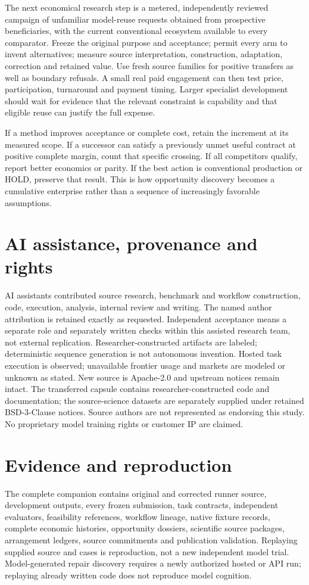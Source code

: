 \documentclass[11pt,letterpaper]{article}
\begin{document}
The next economical research step is a metered, independently reviewed campaign of unfamiliar model-reuse requests obtained from prospective beneficiaries, with the current conventional ecosystem available to every comparator. Freeze the original purpose and acceptance; permit every arm to invent alternatives; measure source interpretation, construction, adaptation, correction and retained value. Use fresh source families for positive transfers as well as boundary refusals. A small real paid engagement can then test price, participation, turnaround and payment timing. Larger specialist development should wait for evidence that the relevant constraint is capability and that eligible reuse can justify the full expense.

If a method improves acceptance or complete cost, retain the increment at its measured scope. If a successor can satisfy a previously unmet useful contract at positive complete margin, count that specific crossing. If all competitors qualify, report better economics or parity. If the best action is conventional production or HOLD, preserve that result. This is how opportunity discovery becomes a cumulative enterprise rather than a sequence of increasingly favorable assumptions.

\section*{AI assistance, provenance and rights}
AI assistants contributed source research, benchmark and workflow construction, code, execution, analysis, internal review and writing. The named author attribution is retained exactly as requested. Independent acceptance means a separate role and separately written checks within this assisted research team, not external replication. Researcher-constructed artifacts are labeled; deterministic sequence generation is not autonomous invention. Hosted task execution is observed; unavailable frontier usage and markets are modeled or unknown as stated. New source is Apache-2.0 and upstream notices remain intact. The transferred capsule contains researcher-constructed code and documentation; the source-science datasets are separately supplied under retained BSD-3-Clause notices. Source authors are not represented as endorsing this study. No proprietary model training rights or customer IP are claimed.

\appendix
\section{Evidence and reproduction}
The complete companion contains original and corrected runner source, development outputs, every frozen submission, task contracts, independent evaluators, feasibility references, workflow lineage, native fixture records, complete economic histories, opportunity dossiers, scientific source packages, arrangement ledgers, source commitments and publication validation. Replaying supplied source and cases is reproduction, not a new independent model trial. Model-generated repair discovery requires a newly authorized hosted or API run; replaying already written code does not reproduce model cognition.
\end{document}
